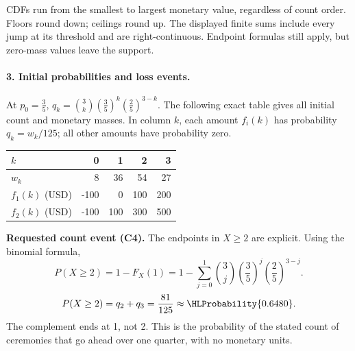 CDFs run from the smallest to largest monetary value, regardless of count order. Floors round down; ceilings round up. The displayed finite sums include every jump at its threshold and are right-continuous. Endpoint formulas still apply, but zero-mass values leave the support.
\clearpage\paragraph{3. Initial probabilities and loss events.}
At $p_0=\frac{3}{5}$, $q_k=\binom{3}k(\frac{3}{5})^k(\frac{2}{5})^{3-k}$. The following exact table gives all initial count and monetary masses. In column $k$, each amount $f_i(k)$ has probability $q_k=w_k/125$; all other amounts have probability zero.
\begin{center}\begin{tabular}{lrrrr}\toprule
$k$ & 0 & 1 & 2 & 3\\\midrule
$w_k$ & 8 & 36 & 54 & 27\\
$f_1(k)$ (USD) & -100 & 0 & 100 & 200\\
$f_2(k)$ (USD) & -100 & 100 & 300 & 500\\
\bottomrule\end{tabular}\end{center}
\textbf{Requested count event (C4).} The endpoints in $X\geq 2$ are explicit. Using the binomial formula,
\[P(X\geq 2)=1-F_X(1)=1-\sum_{j=0}^{1}\binom{3}j(\frac{3}{5})^j(\frac{2}{5})^{3-j}.\]
\[P(X\geq 2)=q_{2}+q_{3}=\frac{81}{125}\approx\HLProbability{0.6480}.\]
The complement ends at 1, not 2.
This is the probability of the stated count of ceremonies that go ahead over one quarter, with no monetary units.
\clearpage
